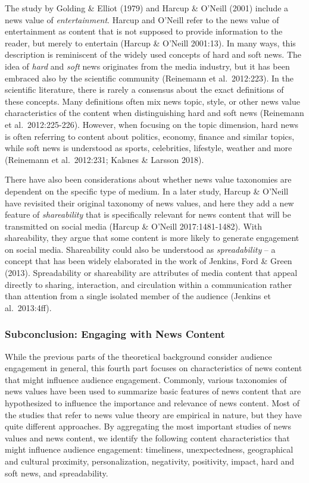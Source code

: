 \documentclass[
]{article}
\begin{document}
The study by Golding \& Elliot (1979) and Harcup \& O'Neill (2001)
include a news value of \emph{entertainment}. Harcup and O'Neill refer
to the news value of entertainment as content that is not supposed to
provide information to the reader, but merely to entertain (Harcup \&
O'Neill 2001:13). In many ways, this description is reminiscent of the
widely used concepts of hard and soft news. The idea of \emph{hard} and
\emph{soft} news originates from the media industry, but it has been
embraced also by the scientific community (Reinemann et al.~2012:223).
In the scientific literature, there is rarely a consensus about the
exact definitions of these concepts. Many definitions often mix news
topic, style, or other news value characteristics of the content when
distinguishing hard and soft news (Reinemann et al.~2012:225-226).
However, when focusing on the topic dimension, hard news is often
referring to content about politics, economy, finance and similar
topics, while soft news is understood as sports, celebrities, lifestyle,
weather and more (Reinemann et al.~2012:231; Kalsnes \& Larsson 2018).

There have also been considerations about whether news value taxonomies
are dependent on the specific type of medium. In a later study, Harcup
\& O'Neill have revisited their original taxonomy of news values, and
here they add a new feature of \emph{shareability} that is specifically
relevant for news content that will be transmitted on social media
(Harcup \& O'Neill 2017:1481-1482). With shareability, they argue that
some content is more likely to generate engagement on social media.
Shareability could also be understood as \emph{spreadability} -- a
concept that has been widely elaborated in the work of Jenkins, Ford \&
Green (2013). Spreadability or shareability are attributes of media
content that appeal directly to sharing, interaction, and circulation
within a communication rather than attention from a single isolated
member of the audience (Jenkins et al.~2013:4ff).

\hypertarget{subconclusion-engaging-with-news-content}{%
\subsubsection{Subconclusion: Engaging with News
Content}\label{subconclusion-engaging-with-news-content}}

\noindent While the previous parts of the theoretical background
consider audience engagement in general, this fourth part focuses on
characteristics of news content that might influence audience
engagement. Commonly, various taxonomies of news values have been used
to summarize basic features of news content that are hypothesized to
influence the importance and relevance of news content. Most of the
studies that refer to news value theory are empirical in nature, but
they have quite different approaches. By aggregating the most important
studies of news values and news content, we identify the following
content characteristics that might influence audience engagement:
timeliness, unexpectedness, geographical and cultural proximity,
personalization, negativity, positivity, impact, hard and soft news, and
spreadability.
\end{document}

